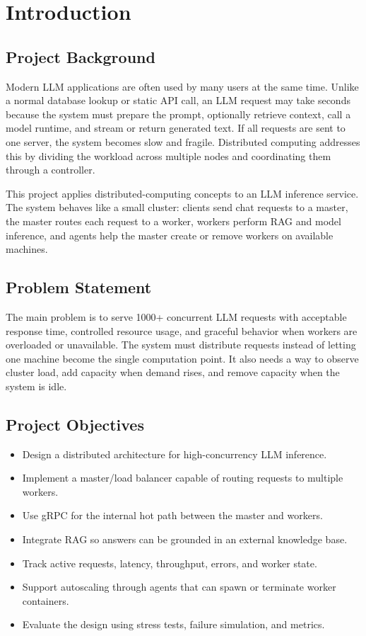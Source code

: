 \section{Introduction}

\subsection{Project Background}
Modern LLM applications are often used by many users at the same time. Unlike a normal database lookup or static API call, an LLM request may take seconds because the system must prepare the prompt, optionally retrieve context, call a model runtime, and stream or return generated text. If all requests are sent to one server, the system becomes slow and fragile. Distributed computing addresses this by dividing the workload across multiple nodes and coordinating them through a controller.

This project applies distributed-computing concepts to an LLM inference service. The system behaves like a small cluster: clients send chat requests to a master, the master routes each request to a worker, workers perform RAG and model inference, and agents help the master create or remove workers on available machines.

\subsection{Problem Statement}
The main problem is to serve 1000+ concurrent LLM requests with acceptable response time, controlled resource usage, and graceful behavior when workers are overloaded or unavailable. The system must distribute requests instead of letting one machine become the single computation point. It also needs a way to observe cluster load, add capacity when demand rises, and remove capacity when the system is idle.

\subsection{Project Objectives}
\begin{itemize}[leftmargin=1.5em]
  \item Design a distributed architecture for high-concurrency LLM inference.
  \item Implement a master/load balancer capable of routing requests to multiple workers.
  \item Use gRPC for the internal hot path between the master and workers.
  \item Integrate RAG so answers can be grounded in an external knowledge base.
  \item Track active requests, latency, throughput, errors, and worker state.
  \item Support autoscaling through agents that can spawn or terminate worker containers.
  \item Evaluate the design using stress tests, failure simulation, and metrics.
\end{itemize}

